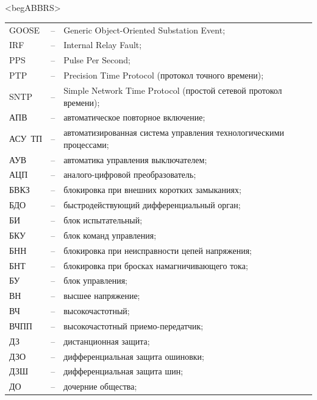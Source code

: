 \color{unimain}\section*{}
{\color{white}\fontsize{0.1pt}{0.1pt}\selectfont<begABBRS>}
\color{black}
\begin{longtable}{>{\raggedright\arraybackslash}m{2cm}>{\raggedright\arraybackslash}m{0.5cm}>{\raggedright\arraybackslash}m{20cm}}
\endfirsthead\endhead\endfoot\endlastfoot
GOOSE & -- & Generic Object-Oriented Substation Event; \\
IRF & -- & Internal Relay Fault; \\
PPS & -- & Pulse Per Second; \\
PTP & -- & Precision Time Protocol (протокол точного времени); \\
SNTP & -- & Simple Network Time Protocol (простой сетевой протокол времени); \\
АПВ & -- & автоматическое повторное включение; \\
АСУ~ТП & -- & автоматизированная система управления технологическими процессами; \\
АУВ & -- & автоматика управления выключателем; \\
АЦП & -- & аналого-цифровой преобразователь; \\
БВКЗ & -- & блокировка при внешних коротких замыканиях; \\
БДО & -- & быстродействующий дифференциальный орган; \\
БИ & -- & блок испытательный; \\
БКУ & -- & блок команд управления; \\
БНН & -- & блокировка при неисправности цепей напряжения; \\
БНТ & -- & блокировка при бросках намагничивающего тока; \\
БУ & -- & блок управления; \\
ВН & -- & высшее напряжение; \\
ВЧ & -- & высокочастотный; \\
ВЧПП & -- & высокочастотный приемо-передатчик; \\
ДЗ & -- & дистанционная защита; \\
ДЗО & -- & дифференциальная защита ошиновки; \\
ДЗШ & -- & дифференциальная защита шин; \\
ДО & -- & дочерние общества; \\

\end{longtable}

